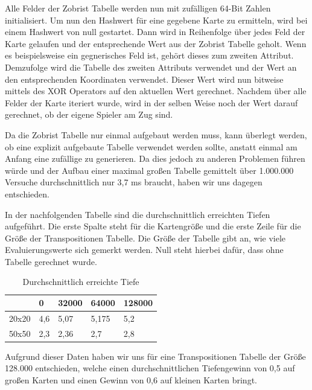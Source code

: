 \documentclass[12pt,a4paper,bibliography=totocnumbered,listof=totocnumbered]{article}
\begin{document}
Alle Felder der Zobrist Tabelle werden nun mit zufälligen 64-Bit Zahlen initialisiert.
Um nun den Hashwert für eine gegebene Karte zu ermitteln, wird bei einem Hashwert von null gestartet. Dann wird in Reihenfolge über jedes Feld der Karte gelaufen und der entsprechende Wert aus der Zobrist Tabelle geholt. Wenn es beispielsweise ein gegnerisches Feld ist, gehört dieses zum zweiten Attribut. Demzufolge wird die Tabelle des zweiten Attributs verwendet und der Wert an den entsprechenden Koordinaten verwendet. Dieser Wert wird nun bitweise mittels des XOR Operators auf den aktuellen Wert gerechnet. Nachdem über alle Felder der Karte iteriert wurde, wird in der selben Weise noch der Wert darauf gerechnet, ob der eigene Spieler am Zug sind.

Da die Zobrist Tabelle nur einmal aufgebaut werden muss, kann überlegt werden, ob eine explizit aufgebaute Tabelle verwendet werden sollte, anstatt einmal am Anfang eine zufällige zu generieren.
Da dies jedoch zu anderen Problemen führen würde und der Aufbau einer maximal großen Tabelle gemittelt über 1.000.000 Versuche durchschnittlich nur 3,7 ms braucht, haben wir uns dagegen entschieden.

In der nachfolgenden Tabelle sind die durchschnittlich erreichten Tiefen aufgeführt. Die erste Spalte steht für die Kartengröße und die erste Zeile für die Größe der Transpositionen Tabelle. Die Größe der Tabelle gibt an, wie viele Evaluierungswerte sich gemerkt werden. Null steht hierbei dafür, dass ohne Tabelle gerechnet wurde.

\begin{table}[!h]
\centering
	\begin{tabular} {| m{1.7cm} | m{3cm} | m{3cm} | m{3cm} | m{3cm}|}
		\hline
		\textbf{} &\textbf{0} &\textbf{32000} & \textbf{64000} & \textbf{128000}\\
		\hline
		20x20 & 4,6 & 5,07 & 5,175 & 5,2 \\
		\hline
		50x50 & 2,3 & 2,36 & 2,7 & 2,8 \\
		\hline
	\end{tabular}
	\caption{Durchschnittlich erreichte Tiefe}
	\label{tab:tasks}
\end{table}

Aufgrund dieser Daten haben wir uns für eine Transpositionen Tabelle der Größe 128.000 entschieden, welche einen durchschnittlichen Tiefengewinn von 0,5 auf großen Karten und einen Gewinn von 0,6 auf kleinen Karten bringt.

\newpage
\end{document}
